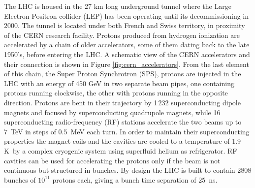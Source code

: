 The LHC is housed in the 27 km long underground tunnel where the Large Electron Positron collider (LEP) has been operating until its decommissioning in 2000. The tunnel is located under both French and Swiss territory, in proximity of the CERN research facility. 
Protons produced from hydrogen ionization are accelerated by a chain of older accelerators, some of them dating back to the late 1950's, before entering the LHC. %
A schematic view of the CERN accelerators and their connection is shown in Figure \ref{fig:cern_accelerators}. From the last element of this chain, the Super Proton Synchrotron (SPS), protons are injected in the LHC with an energy of 450 GeV in two separate beam pipes, one containing protons running clockwise, the other with protons running in the opposite direction. Protons are bent in their trajectory by 1\,232 superconducting dipole magnets and focused by  superconducting quadrupole magnets, while 16 superconducting radio-frequency (RF) stations 
accelerate the two beams up to 7~TeV in steps of 0.5~MeV each turn. In order to maintain their superconducting properties the magnet coils and the cavities are cooled to a temperature of 1.9 K~by a complex cryogenic system using superfluid helium as refrigerator. RF cavities can be used for accelerating the protons only if the beam is not continuous but structured in bunches. By design the LHC is built to contain 2808 bunches of $10^{11}$ protons each, giving a bunch time separation of 25~ns.

